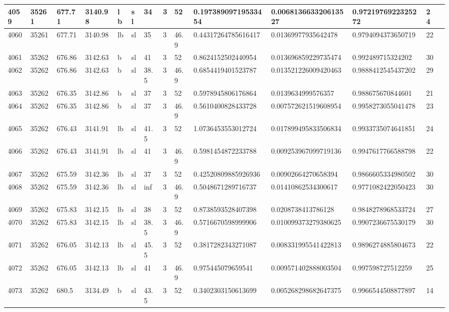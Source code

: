 \documentclass[11pt,a4paper]{article}
\begin{document}
\begin{table}[h]
\begin{tabular}{|l|l|l|l|l|l|l|l|l|l|l|l|l|l|}
4059 & 35261 & 677.71 & 3140.98 & lb & sl & 34 & 3 & 52 & 0.19738909719533454 & 0.006813663320613527 & 0.9721976922325272 & 24 &  \\ \hline
4060 & 35261 & 677.71 & 3140.98 & lb & sl & 35 & 3 & 46.9 & 0.44317264785616417 & 0.01369977935642478 & 0.9794094373650719 & 22 &  \\ \hline
4061 & 35262 & 676.86 & 3142.63 & b & sl & 41 & 3 & 52 & 0.8624152502440954 & 0.013696859229735474 & 0.992489715324202 & 30 &  \\ \hline
4062 & 35262 & 676.86 & 3142.63 & b & sl & 38.5 & 3 & 46.9 & 0.6854419401523787 & 0.013521226009420463 & 0.9888412545437202 & 29 &  \\ \hline
4063 & 35262 & 676.35 & 3142.86 & b & sl & 37 & 3 & 52 & 0.5978945806176864 & 0.0139634999576357 & 0.988675670844601 & 21 &  \\ \hline
4064 & 35262 & 676.35 & 3142.86 & b & sl & 37 & 3 & 46.9 & 0.5610400828433728 & 0.007572621519608954 & 0.9958273055041478 & 23 &  \\ \hline
4065 & 35262 & 676.43 & 3141.91 & lb & sl & 41.5 & 3 & 52 & 1.0736453553012724 & 0.017899495833506834 & 0.9933735074641851 & 24 &  \\ \hline
4066 & 35262 & 676.43 & 3141.91 & lb & sl & 41 & 3 & 46.9 & 0.5981454872233788 & 0.009253967099719136 & 0.9947617766588798 & 22 &  \\ \hline
4067 & 35262 & 675.59 & 3142.36 & lb & sl & 37 & 3 & 52 & 0.42520809885926936 & 0.00902664270658394 & 0.9866605334980502 & 30 &  \\ \hline
4068 & 35262 & 675.59 & 3142.36 & lb & sl & inf & 3 & 46.9 & 0.5048671289716737 & 0.01410862534300617 & 0.9771082422050423 & 30 &  \\ \hline
4069 & 35262 & 675.83 & 3142.15 & lb & sl & 38 & 3 & 52 & 0.8738593528407398 & 0.0208738413786128 & 0.9848278968533724 & 27 &  \\ \hline
4070 & 35262 & 675.83 & 3142.15 & lb & sl & 38.5 & 3 & 46.9 & 0.5716670598999906 & 0.010099373279380625 & 0.9907236675530179 & 30 &  \\ \hline
4071 & 35262 & 676.05 & 3142.13 & lb & sl & 45.5 & 3 & 52 & 0.3817282343271087 & 0.008331995541422813 & 0.9896274885804673 & 22 &  \\ \hline
4072 & 35262 & 676.05 & 3142.13 & lb & sl & 41 & 3 & 46.9 & 0.975445079659541 & 0.009571402888003504 & 0.997598727512259 & 25 &  \\ \hline
4073 & 35262 & 680.5 & 3134.49 & b & sl & 43.5 & 3 & 52 & 0.3402303150613699 & 0.005268298682647375 & 0.9966544508877897 & 14 &  \\ \hline

\end{tabular}
\end{table}
\end{document}
